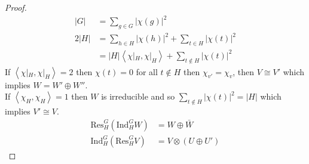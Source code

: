 \documentclass[letterpaper, leqno, 12pt]{article}
\newcommand{\Ind}{\mbox{Ind}}
\newcommand{\Res}{\mbox{Res}}
\providecommand{\ip}[1]{\left\langle #1 \right\rangle}
\theoremstyle{stdthm}
\newtheorem{prop}[thm]{Proposition}
\theoremstyle{stddef}
\newtheorem{defn}[thm]{Definition}
\theoremstyle{stdnonum}
\theoremstyle{stdqands}
\theoremstyle{stdbold}
\begin{document}
\begin{proof}
\begin{align*}
|G| &= \sum_{g \in G} |\chi(g)|^2\\
2|H| &= \sum_{h \in H} | \chi(h)|^2 + \sum_{t \in H} |\chi(t)|^2 \\
&= |H| \ip{\chi|_H, \chi|_H} + \sum_{t \notin H} |\chi(t)|^2
\end{align*}
If $\ip{\chi|_H, \chi|_H} = 2$ then $\chi(t) = 0$ for all $t \notin H$ then $\chi_{v'} = \chi_v$, then $V \cong V'$ which implies $W = W' \oplus W''$. \\

\noindent If $\ip{\chi_H, \chi_H} = 1$ then $W$ is irreducible and so $\sum_{t\notin H} |\chi(t)|^2 = |H|$ which implies $V' \cong V$.
\begin{align*}
\Res_H^G(\Ind_H^G W) &= W \oplus \bar{W}\\
\Ind_H^G(\Res_H^G V) &= V \otimes (U \oplus U')
\end{align*} 
\end{proof}



\end{document}
